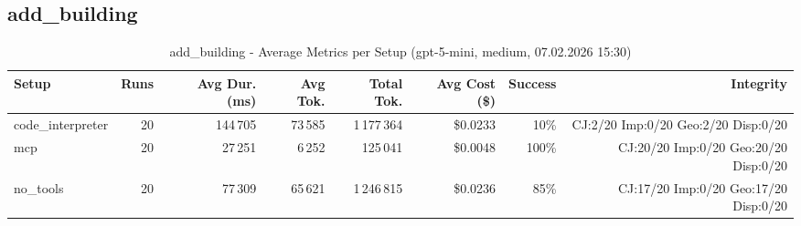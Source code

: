 \documentclass[a4paper,11pt]{article}
\begin{document}
\clearpage

\subsection{add\_building}

\begin{table}[H]
\centering
\scriptsize
\caption{add\_building - Average Metrics per Setup (gpt-5-mini, medium, 07.02.2026 15:30)}
\label{tab:combined\_add\_building\_metrics\_20260207}
\begin{tabular}{l r r r r r r r}
\toprule
Setup & Runs & Avg Dur. (ms) & Avg Tok. & Total Tok. & Avg Cost (\$) & Success & Integrity \\
\midrule
code\_interpreter & 20 & 144\,705 & 73\,585 & 1\,177\,364 & \$0.0233 & 10\% & CJ:2/20 Imp:0/20 Geo:2/20 Disp:0/20 \\
mcp & 20 & 27\,251 & 6\,252 & 125\,041 & \$0.0048 & 100\% & CJ:20/20 Imp:0/20 Geo:20/20 Disp:0/20 \\
no\_tools & 20 & 77\,309 & 65\,621 & 1\,246\,815 & \$0.0236 & 85\% & CJ:17/20 Imp:0/20 Geo:17/20 Disp:0/20 \\
\bottomrule
\end{tabular}
\end{table}
\end{document}
